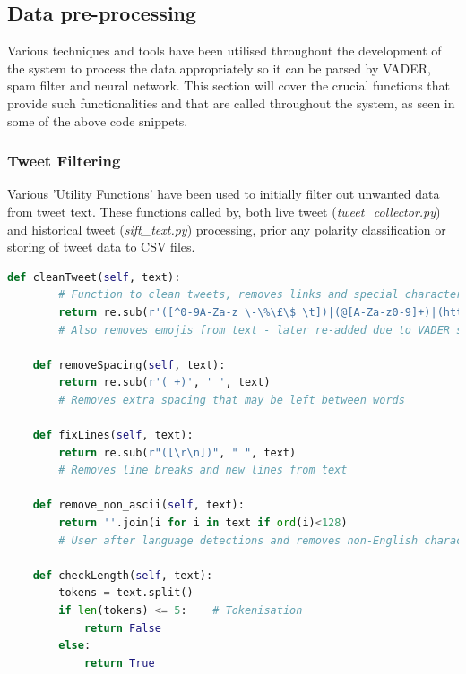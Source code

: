 \documentclass[oneside, 12pt]{article}
\begin{document}
			\newpage
		\subsection{Data pre-processing}\label{processing}
			
			Various techniques and tools have been utilised throughout the development of the system to process the data appropriately so it can be parsed by VADER, spam filter and neural network. This section will cover the crucial functions that provide such functionalities and that are called throughout the system, as seen in some of the above code snippets.
			
			\subsubsection{Tweet Filtering}
			
			Various 'Utility Functions' have been used to initially filter out unwanted data from tweet text. These functions called by, both live tweet (\textit{tweet\_collector.py}) and historical tweet (\textit{sift\_text.py}) processing, prior any polarity classification or storing of tweet data to CSV files.
				
				\begin{lstlisting}[language=python, caption=Basic data filtering and processing function - defined in 'tweet\_collector.py']
	def cleanTweet(self, text):
		# Function to clean tweets, removes links and special characters
		return re.sub(r'([^0-9A-Za-z \-\%\£\$ \t])|(@[A-Za-z0-9]+)|(http\S+)', '', text), ' '.join(c for c in text if c in ji.UNICODE_EMOJI)
		# Also removes emojis from text - later re-added due to VADER supporting emoticons
				
	def removeSpacing(self, text):
		return re.sub(r'( +)', ' ', text)
		# Removes extra spacing that may be left between words
				
	def fixLines(self, text):
		return re.sub(r"([\r\n])", " ", text)
		# Removes line breaks and new lines from text
								
	def remove_non_ascii(self, text):
		return ''.join(i for i in text if ord(i)<128)
		# User after language detections and removes non-English characters from text
		
	def checkLength(self, text):
		tokens = text.split()
		if len(tokens) <= 5:	# Tokenisation
			return False
		else:
			return True
				\end{lstlisting}
				
\end{document}
